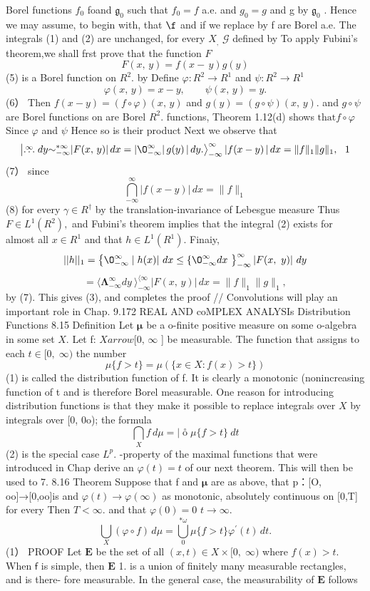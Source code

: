 Borel functions $f_{0}$ foand ${\mathfrak{g}}_{0}$ such that $f_{0}=f$ a.e. and $g_{0}=g$ and g by ${\mathfrak{g}}_{0}$ . Hence we may assume, to begin with, that $\boldsymbol{\f}$ and if we replace by f are Borel a.e. The integrals (1) and (2) are unchanged, for every $\scriptstyle X_{\mathrm{,}}$ $\scriptstyle{\mathcal{G}}$ defined by To apply Fubini's theorem,we shall frst prove that the function ${\mathbf{}}F$ $$ F(x,\,y)=f(x-\,y)g(y) $$ (5) is a Borel function on $R^{2}.$ by Define $\varphi\colon R^{2}\to R^{1}$ and $\textstyle\psi\colon R^{2}\to R^{1}$ $$ \varphi(x,\,y)=x-y,\qquad\psi(x,\,y)=y. $$ (6） Then $f(x-y)=(f\circ\varphi)(x,\,y)$ and $g(y)=(g\circ\psi)(x,\,y).$ and $g\circ\psi$ are Borel functions on are Borel $R^{2}.$ functions, Theorem 1.12(d) shows $\mathrm{that}f\circ\varphi$ Since $\varphi$ and $\psi$ Hence so is their product Next we observe that $$ \left|\stackrel{\infty}{\ldots}d y\ \\ {\sim}_{-\infty}^{*\infty}|F(x,\,y)|\,d x= |\O_{-\infty}^{\infty}|\,g(y)\,|\,d y .\right>_{-\infty}^{\infty}|f(x-y)\,|\,d x=\|f\|_{1}\|g\|_{1},\,\,{\mathrm{~1}} $$ (7） since $$ \bigcap_{-\infty}^{\infty}|f(x-y)|\,d x=\|f\|_{1} $$ (8) for every $\scriptstyle\gamma\in R^{\dagger}$ by the translation-invariance of Lebesgue measure Thus $F\in L^{1}(R^{2}),$ and Fubini's theorem implies that the integral (2) exists for almost all $x\in R^{1}$ and that $h\in L^{1}(R^{1}).$ Finaiy, $$ ||h||_{1}=\left\{\O_{-\infty}^{\infty}\mid h(x)|\ d x\leq \{\O_{-\infty}^{\infty}d x\ \right\}_{-\infty}^{\infty}|F(x,\ y)|\ d y $$ $$ = \langle\mathbf{\Lambda}_{-\infty}^{\infty}d y\ \rangle_{-\infty}^{\langle\infty}|F(x,\,y)|\,d x=\|f\|_{1}\|g\|_{1}, $$ by (7). This gives (3), and completes the proof // Convolutions will play an important role in Chap. 9.172 REAL AND coMPLEX ANALYSIs Distribution Functions 8.15 Definition Let ${\boldsymbol{\mu}}$ be a o-finite positive measure on some o-algebra in some set $X.$ Let f: $X{ arrow}[0,\,\infty$ ] be measurable. The function that assigns to each $t\in[0,\;\infty)$ the number $$ \mu\{f>t\}=\mu(\{x\in X:f(x)>t\}) $$ (1) is called the distribution function of f. It is clearly a monotonic (nonincreasing function of t and is therefore Borel measurable. One reason for introducing distribution functions is that they make it possible to replace integrals over $\textstyle X$ by integrals over [0, 0o); the formula $$ \bigcap_{X}f\,d\mu= \vert{\overset{\circ}{\operatorname{o}}}\mu\{f>t\}\ d t $$ (2) is the special case $L^{p}.$ -property of the maximal functions that were introduced in Chap derive an $\varphi(t)=t$ of our next theorem. This will then be used to 7. 8.16 Theorem Suppose that f and ${\boldsymbol{\mu}}$ are as above, that p：[O, oo]→[0,oo]is and $\varphi(t)\to\varphi(\infty)$ as monotonic, absolutely continuous on [0,T] for every Then $T<\infty.$ and that $\varphi(0)=0$ $t\to\infty.$ $$ \bigcup_{X}(\varphi\circ f)\,d\mu=\bigcup_{0}^{*\omega}\mu\{f>t\}\varphi^{\prime}(t)\,d t. $$ (1） PROOF Let $\boldsymbol{E}$ be the set of all $(x,t)\in X\times[0,\;\infty)$ where $f(x)>t.$ When $\boldsymbol{\mathsf{f}}$ is simple, then $\boldsymbol{E}$ 1. is a union of finitely many measurable rectangles, and is there- fore measurable. In the general case, the measurability of $\boldsymbol{E}$ follows 